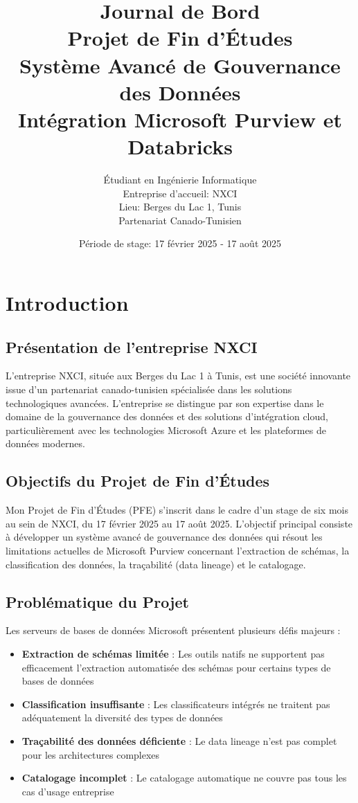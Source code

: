 \documentclass[12pt,a4paper]{article}
\title{\Huge\textbf{Journal de Bord}\\
\Large Projet de Fin d'Études\\
\large Système Avancé de Gouvernance des Données\\
\normalsize Intégration Microsoft Purview et Databricks}
\author{Étudiant en Ingénierie Informatique\\
Entreprise d'accueil: NXCI\\
Lieu: Berges du Lac 1, Tunis\\
Partenariat Canado-Tunisien}
\date{Période de stage: 17 février 2025 - 17 août 2025}
\begin{document}
\maketitle

\newpage
\tableofcontents

\newpage

\section{Introduction}

\subsection{Présentation de l'entreprise NXCI}

L'entreprise NXCI, située aux Berges du Lac 1 à Tunis, est une société innovante issue d'un partenariat canado-tunisien spécialisée dans les solutions technologiques avancées. L'entreprise se distingue par son expertise dans le domaine de la gouvernance des données et des solutions d'intégration cloud, particulièrement avec les technologies Microsoft Azure et les plateformes de données modernes.

\subsection{Objectifs du Projet de Fin d'Études}

Mon Projet de Fin d'Études (PFE) s'inscrit dans le cadre d'un stage de six mois au sein de NXCI, du 17 février 2025 au 17 août 2025. L'objectif principal consiste à développer un système avancé de gouvernance des données qui résout les limitations actuelles de Microsoft Purview concernant l'extraction de schémas, la classification des données, la traçabilité (data lineage) et le catalogage.

\subsection{Problématique du Projet}

Les serveurs de bases de données Microsoft présentent plusieurs défis majeurs :
\begin{itemize}
    \item \textbf{Extraction de schémas limitée} : Les outils natifs ne supportent pas efficacement l'extraction automatisée des schémas pour certains types de bases de données
    \item \textbf{Classification insuffisante} : Les classificateurs intégrés ne traitent pas adéquatement la diversité des types de données
    \item \textbf{Traçabilité des données déficiente} : Le data lineage n'est pas complet pour les architectures complexes
    \item \textbf{Catalogage incomplet} : Le catalogage automatique ne couvre pas tous les cas d'usage entreprise
\end{itemize}
\end{document}
